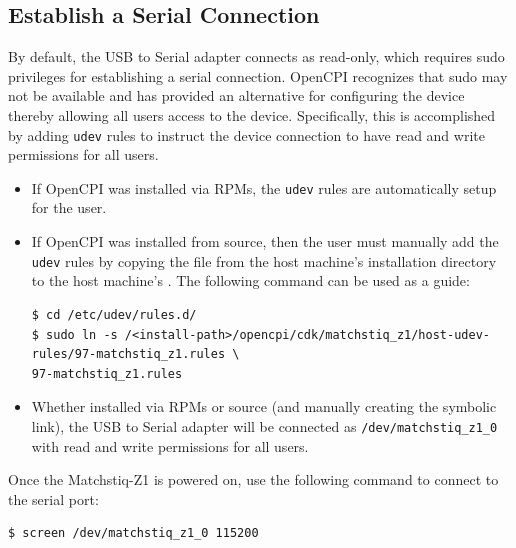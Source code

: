\subsection{Establish a Serial Connection}
By default, the USB to Serial adapter connects as read-only, which requires sudo privileges for establishing a serial connection. OpenCPI recognizes that sudo may not be available and has provided an alternative for configuring the device thereby allowing all users access to the device. Specifically, this is accomplished by adding \texttt{udev} rules to instruct the device connection to have read and write permissions for all users.
\begin{itemize}
\item If OpenCPI was installed via RPMs, the \texttt{udev} rules are automatically setup for the user.
\item If OpenCPI was installed from source, then the user must manually add the \texttt{udev} rules by copying the file from the host machine's installation directory to the host machine's . The following command can be used as a guide:
\begin{verbatim}
$ cd /etc/udev/rules.d/
$ sudo ln -s /<install-path>/opencpi/cdk/matchstiq_z1/host-udev-rules/97-matchstiq_z1.rules \
97-matchstiq_z1.rules
\end{verbatim}
\item Whether installed via RPMs or source (and manually creating the symbolic link), the USB to Serial adapter will be connected as \texttt{/dev/matchstiq\_z1\_0} with read and write permissions for all users.
\end{itemize}

\noindent Once the Matchstiq-Z1 is powered on, use the following command to connect to the serial port:
\begin{verbatim}
$ screen /dev/matchstiq_z1_0 115200
\end{verbatim}

